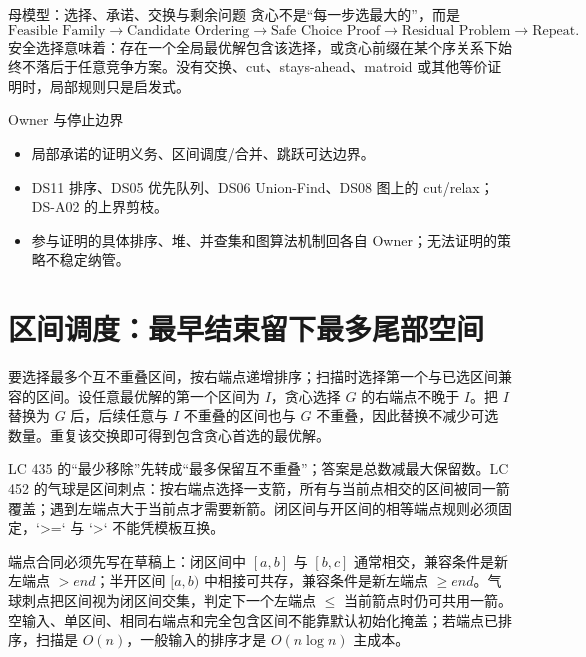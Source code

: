 \documentclass[UTF8,fontset=none,11pt,a4paper]{ctexart}
\begin{document}

\begin{corebox}{母模型：选择、承诺、交换与剩余问题}
贪心不是“每一步选最大的”，而是
\[
\text{Feasible Family}
\to\text{Candidate Ordering}
\to\text{Safe Choice Proof}
\to\text{Residual Problem}
\to\text{Repeat}.
\]
安全选择意味着：存在一个全局最优解包含该选择，或贪心前缀在某个序关系下始终不落后于任意竞争方案。没有交换、cut、stays-ahead、matroid 或其他等价证明时，局部规则只是启发式。
\end{corebox}

\begin{methodbox}{Owner 与停止边界}
\begin{itemize}
\item {}局部承诺的证明义务、区间调度/合并、跳跃可达边界。
\item {}DS11 排序、DS05 优先队列、DS06 Union-Find、DS08 图上的 cut/relax；DS-A02 的上界剪枝。
\item {}参与证明的具体排序、堆、并查集和图算法机制回各自 Owner；无法证明的策略不稳定纳管。
\end{itemize}
\end{methodbox}
\tableofcontents\newpage

\section{区间调度：最早结束留下最多尾部空间}

要选择最多个互不重叠区间，按右端点递增排序；扫描时选择第一个与已选区间兼容的区间。设任意最优解的第一个区间为 $I$，贪心选择 $G$ 的右端点不晚于 $I$。把 $I$ 替换为 $G$ 后，后续任意与 $I$ 不重叠的区间也与 $G$ 不重叠，因此替换不减少可选数量。重复该交换即可得到包含贪心首选的最优解。

LC 435 的“最少移除”先转成“最多保留互不重叠”；答案是总数减最大保留数。LC 452 的气球是区间刺点：按右端点选择一支箭，所有与当前点相交的区间被同一箭覆盖；遇到左端点大于当前点才需要新箭。闭区间与开区间的相等端点规则必须固定，`>=` 与 `>` 不能凭模板互换。

端点合同必须先写在草稿上：闭区间中 $[a,b]$ 与 $[b,c]$ 通常相交，兼容条件是新左端点 $>end$；半开区间 $[a,b)$ 中相接可共存，兼容条件是新左端点 $\ge end$。气球刺点把区间视为闭区间交集，判定下一个左端点 $\le$ 当前箭点时仍可共用一箭。空输入、单区间、相同右端点和完全包含区间不能靠默认初始化掩盖；若端点已排序，扫描是 $O(n)$，一般输入的排序才是 $O(n\log n)$ 主成本。
\end{document}
